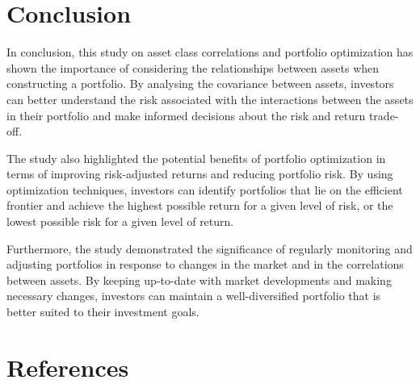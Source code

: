 \documentclass[11pt,preprint, authoryear]{elsarticle}
\numberwithin{equation}{section}
\numberwithin{figure}{section}
\numberwithin{table}{section}
\begin{document}
\hypertarget{conclusion}{%
\section{Conclusion}\label{conclusion}}

In conclusion, this study on asset class correlations and portfolio
optimization has shown the importance of considering the relationships
between assets when constructing a portfolio. By analysing the
covariance between assets, investors can better understand the risk
associated with the interactions between the assets in their portfolio
and make informed decisions about the risk and return trade-off.

The study also highlighted the potential benefits of portfolio
optimization in terms of improving risk-adjusted returns and reducing
portfolio risk. By using optimization techniques, investors can identify
portfolios that lie on the efficient frontier and achieve the highest
possible return for a given level of risk, or the lowest possible risk
for a given level of return.

Furthermore, the study demonstrated the significance of regularly
monitoring and adjusting portfolios in response to changes in the market
and in the correlations between assets. By keeping up-to-date with
market developments and making necessary changes, investors can maintain
a well-diversified portfolio that is better suited to their investment
goals.

\newpage

\hypertarget{references}{%
\section*{References}\label{references}}
\end{document}
